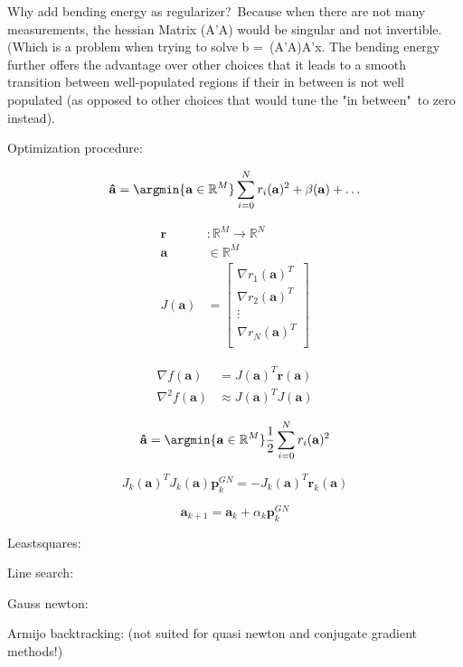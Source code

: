 Why add bending energy as regularizer? Because when there are not many measurements, the hessian Matrix (A'A) would be singular and not invertible. 
(Which is a problem when trying to solve b = (A'A)A'x.
The bending energy further offers the advantage over other choices that it leads to a smooth transition between well-populated regions if their 
in between is not well populated (as opposed to other choices that would tune the "in between" to zero instead). 

Optimization procedure:

\begin{equation}
  \mathbf{\hat{a}} =  
  \argmin{\mathbf{a}\in\mathbb{R}^M} \sum_{i = 0}^{N} r_i(\mathbf{a})^2 +
  \beta(\mathbf{a}) + \ldots 
\end{equation}

\begin{align}
  \mathbf{r} &: \mathbb{R}^M \to \mathbb{R}^N \\
  \mathbf{a} &\in \mathbb{R}^M \\
  J(\mathbf{a}) &= 
  \begin{bmatrix} 
       \nabla r_1(\mathbf a)^T \\
       \nabla r_2(\mathbf a)^T \\
       \vdots \\
       \nabla r_N(\mathbf a)^T \\
  \end{bmatrix}
\end{align}

\begin{align}
  \nabla f(\mathbf a) &= J(\mathbf a) ^T \mathbf r(\mathbf a) \\
  \nabla^2 f(\mathbf a) &\approx J(\mathbf a) ^T J(\mathbf a)
\end{align}

\begin{equation}
  \mathbf{\hat{a}} =  
  \argmin{\mathbf{a}\in\mathbb{R}^M} \frac{1}{2} \sum_{i = 0}^{N} r_i(\mathbf{a})^2
\end{equation}

\begin{equation}
  J_k(\mathbf a) ^TJ_k (\mathbf a) \mathbf p_k^{GN} = - J_k(\mathbf a) ^T\mathbf r_k(\mathbf a)
\end{equation}

\begin{equation}
  \mathbf a_{k+1} = \mathbf a_k + \alpha_k \mathbf p_k^{GN}
\end{equation}

Leastsquares:
\cite[p.245-269]{Nocedal1999}

Line search:
\cite[p.30f]{Nocedal1999}

Gauss newton: 
\cite[p.254]{Nocedal1999}

Armijo backtracking: (not suited for quasi newton and conjugate gradient
methods!)
\cite[p.37]{Nocedal1999}

